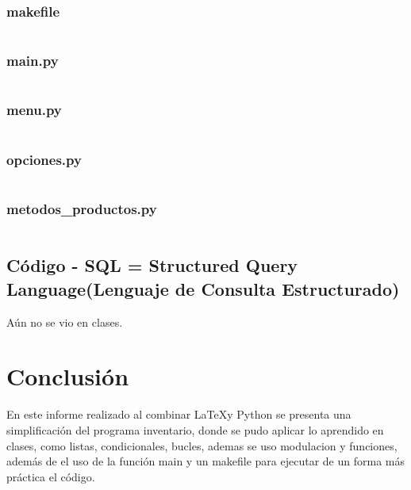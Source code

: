 \documentclass[12pt]{article}
\begin{document}
\subsubsection{makefile}
\inputminted[fontsize=\small]{make}{CodigoCSV/makefile}

\subsubsection{main.py}
\inputminted[fontsize=\small, breaklines=true]{python}{CodigoCSV/main.py}

\subsubsection{menu.py}
\inputminted[fontsize=\small, breaklines=true]{python}{CodigoCSV/menu.py}

\subsubsection{opciones.py}
\inputminted[fontsize=\small, breaklines=true]{python}{CodigoCSV/opciones.py}

\subsubsection{metodos\_productos.py}
\inputminted[fontsize=\small, breaklines=true]{python}{CodigoCSV/metodos_productos.py}
\subsection{Código - SQL = Structured Query Language(Lenguaje de Consulta Estructurado)}

Aún no se vio en clases.
\section{Conclusión}

En este informe realizado al combinar \LaTeX y Python se presenta una simplificación del programa inventario, donde se pudo aplicar lo aprendido en clases, como listas, condicionales, bucles, ademas se uso modulacion y funciones, además de el uso de la función main y un makefile para ejecutar de un forma más práctica el código.
\end{document}
